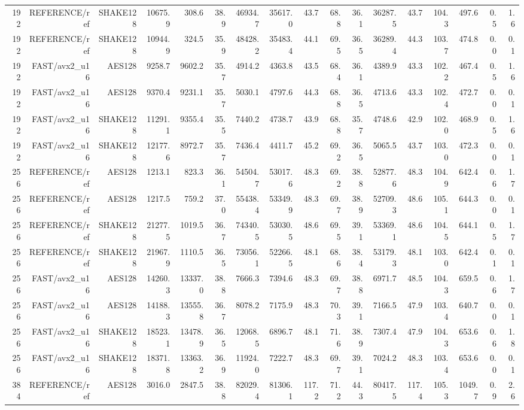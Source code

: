 \begin{table}[t]
\begin{tabular}{rrrrrrrrrrrrrrrrr}
192 & REFERENCE/ref & SHAKE128 & 10675.9 & 308.6 & 38.9 & 46934.7 & 35617.0 & 43.7 & 68.8 & 36.1 & 36287.5 & 43.7 & 104.3 & 497.6 & 0.5 & 1.6 \\
192 & REFERENCE/ref & SHAKE128 & 10944.9 & 324.5 & 35.9 & 48428.2 & 35483.4 & 44.1 & 69.5 & 36.5 & 36289.4 & 44.3 & 103.7 & 474.8 & 0.0 & 0.1 \\
192 & FAST/avx2_u16 & AES128 & 9258.7 & 9602.2 & 35.7 & 4914.2 & 4363.8 & 43.5 & 68.4 & 36.1 & 4389.9 & 43.3 & 102.2 & 467.4 & 0.5 & 1.6 \\
192 & FAST/avx2_u16 & AES128 & 9370.4 & 9231.1 & 35.7 & 5030.1 & 4797.6 & 44.3 & 68.8 & 36.5 & 4713.6 & 43.3 & 102.4 & 472.7 & 0.0 & 0.1 \\
192 & FAST/avx2_u16 & SHAKE128 & 11291.1 & 9355.4 & 35.5 & 7440.2 & 4738.7 & 43.9 & 68.8 & 35.7 & 4748.6 & 42.9 & 102.0 & 468.9 & 0.5 & 1.6 \\
192 & FAST/avx2_u16 & SHAKE128 & 12177.6 & 8972.7 & 35.7 & 7436.4 & 4411.7 & 45.2 & 69.2 & 36.5 & 5065.5 & 43.7 & 103.0 & 472.3 & 0.0 & 0.1 \\
256 & REFERENCE/ref & AES128 & 1213.1 & 823.3 & 36.1 & 54504.7 & 53017.6 & 48.3 & 69.2 & 38.8 & 52877.6 & 48.3 & 104.9 & 642.4 & 0.6 & 1.7 \\
256 & REFERENCE/ref & AES128 & 1217.5 & 759.2 & 37.0 & 55438.4 & 53349.9 & 48.3 & 69.7 & 38.9 & 52709.3 & 48.6 & 105.1 & 644.3 & 0.0 & 0.1 \\
256 & REFERENCE/ref & SHAKE128 & 21277.5 & 1019.5 & 36.7 & 74340.5 & 53030.5 & 48.6 & 69.5 & 39.1 & 53369.1 & 48.6 & 104.5 & 644.1 & 0.5 & 1.7 \\
256 & REFERENCE/ref & SHAKE128 & 21967.9 & 1110.5 & 36.5 & 73056.1 & 52266.5 & 48.1 & 68.6 & 38.4 & 53179.3 & 48.1 & 103.0 & 642.4 & 0.1 & 0.1 \\
256 & FAST/avx2_u16 & AES128 & 14260.3 & 13337.0 & 38.8 & 7666.3 & 7394.6 & 48.3 & 69.7 & 38.8 & 6971.7 & 48.5 & 104.3 & 659.5 & 0.6 & 1.7 \\
256 & FAST/avx2_u16 & AES128 & 14188.3 & 13555.8 & 36.7 & 8078.2 & 7175.9 & 48.3 & 70.3 & 39.1 & 7166.5 & 47.9 & 103.4 & 640.7 & 0.0 & 0.1 \\
256 & FAST/avx2_u16 & SHAKE128 & 18523.1 & 13478.9 & 36.5 & 12068.5 & 6896.7 & 48.1 & 71.6 & 38.9 & 7307.4 & 47.9 & 104.3 & 653.6 & 0.6 & 1.8 \\
256 & FAST/avx2_u16 & SHAKE128 & 18371.8 & 13363.2 & 36.9 & 11924.0 & 7222.7 & 48.3 & 69.7 & 39.1 & 7024.2 & 48.3 & 103.4 & 653.6 & 0.0 & 0.1 \\
384 & REFERENCE/ref & AES128 & 3016.0 & 2847.5 & 38.8 & 82029.4 & 81306.1 & 117.2 & 71.2 & 44.3 & 80417.5 & 117.4 & 105.3 & 1049.7 & 0.9 & 2.6 \\

\end{tabular}
\end{table}
